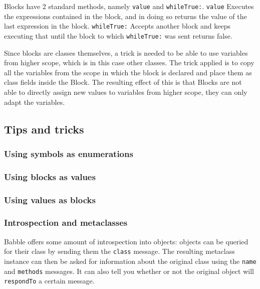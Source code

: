 \documentclass[a4paper]{article}
\begin{document}
Blocks have 2 standard methods, namely \texttt{value} and \texttt{whileTrue:}. \texttt{value} Executes the expressions contained in the block, and in doing so returns the value of the last expression in the block. \texttt{whileTrue:} Accepts another block and keeps executing that until the block to which \texttt{whileTrue:} was sent returns false.

Since blocks are classes themselves, a trick is needed to be able to use variables from higher scope, which is in this case other classes. The trick applied is to copy all the variables from the scope in which the block is declared and place them as class fields inside the Block. The resulting effect of this is that Blocks are not able to directly assign new values to variables from higher scope, they can only adapt the variables.



\subsection{Tips and tricks}

\subsubsection{Using symbols as enumerations}

\subsubsection{Using blocks as values}

\subsubsection{Using values as blocks}

\subsubsection{Introspection and metaclasses}

Babble offers some amount of introspection into objects: objects can be queried for their class by sending them the \texttt{class} message.
The resulting metaclass instance can then be asked for information about the original class using the \texttt{name} and \texttt{methods} messages.
It can also tell you whether or not the original object will \texttt{respondTo} a certain message.
\end{document}
